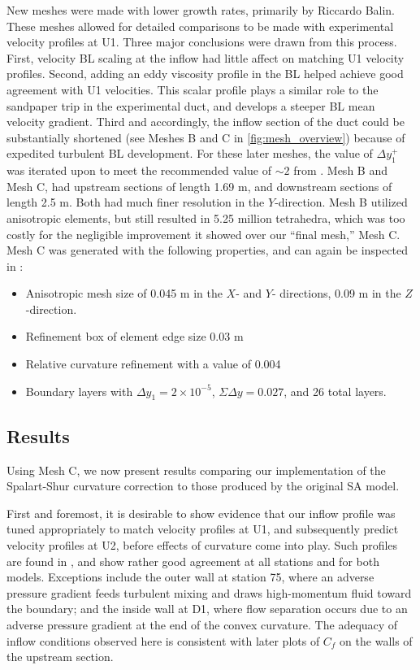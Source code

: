 \documentclass[11pt]{article}
\begin{document}
New meshes were made with lower growth rates, primarily by Riccardo Balin. These meshes allowed for detailed comparisons to be made with experimental velocity profiles at U1. Three major conclusions were drawn from this process. First, velocity BL scaling at the inflow had little affect on matching U1 velocity profiles. Second, adding an eddy viscosity profile in the BL helped achieve good agreement with U1 velocities. This scalar profile plays a similar role to the sandpaper trip in the experimental duct, and develops a steeper BL mean velocity gradient. Third and accordingly, the inflow section of the duct could be substantially shortened (see Meshes B and C in \ref{fig:mesh_overview}) because of expedited turbulent BL development. For these later meshes, the value of $\Delta y^+_1$ was iterated upon to meet the recommended value of $\sim 2$ from \citet{spalart2001}. Mesh B and Mesh C, had upstream sections of length 1.69 m, and downstream sections of length 2.5 m. Both had much finer resolution in the $Y$-direction. Mesh B utilized anisotropic elements, but still resulted in 5.25 million tetrahedra, which was too costly for the negligible improvement it showed over our ``final mesh,'' Mesh C. Mesh C was generated with the following properties, and can again be inspected in :
\begin{itemize}
\item Anisotropic mesh size of 0.045 m in the $X$- and $Y$- directions, 0.09 m in the $Z$-direction.
\item Refinement box of element edge size 0.03 m
\item Relative curvature refinement with a value of 0.004
\item Boundary layers with $\Delta y_1 = 2 \times 10^{-5}$, $\Sigma \Delta y = 0.027$, and 26 total layers.
\end{itemize}

\subsection{Results}

Using Mesh C, we now present results comparing our implementation of the Spalart-Shur curvature correction to those produced by the original SA model.

First and foremost, it is desirable to show evidence that our inflow profile was tuned appropriately to match velocity profiles at U1, and subsequently predict velocity profiles at U2, before effects of curvature come into play. Such profiles are found in , and show rather good agreement at all stations and for both models. Exceptions include the outer wall at station 75, where an adverse pressure gradient feeds turbulent mixing and draws high-momentum fluid toward the boundary; and the inside wall at D1, where flow separation occurs due to an adverse pressure gradient at the end of the convex curvature. The adequacy of inflow conditions observed here is consistent with later plots of $C_f$ on the walls of the upstream section.
\end{document}
